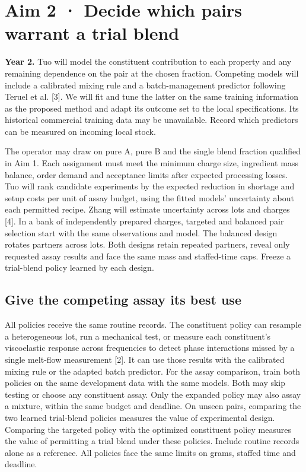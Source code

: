\documentclass[11pt,letterpaper]{article}
\begin{document}
\newpage

\section*{Aim 2 · Decide which pairs warrant a trial blend}

\textbf{Year 2.} Tuo will model the constituent contribution to each property and any remaining dependence on the pair at the chosen fraction. Competing models will include a calibrated mixing rule and a batch-management predictor following Teruel et al. [3]. We will fit and tune the latter on the same training information as the proposed method and adapt its outcome set to the local specifications. Its historical commercial training data may be unavailable. Record which predictors can be measured on incoming local stock.

The operator may draw on pure A, pure B and the single blend fraction qualified in Aim 1. Each assignment must meet the minimum charge size, ingredient mass balance, order demand and acceptance limits after expected processing losses. Tuo will rank candidate experiments by the expected reduction in shortage and setup costs per unit of assay budget, using the fitted models' uncertainty about each permitted recipe. Zhang will estimate uncertainty across lots and charges [4]. In a bank of independently prepared charges, targeted and balanced pair selection start with the same observations and model. The balanced design rotates partners across lots. Both designs retain repeated partners, reveal only requested assay results and face the same mass and staffed-time caps. Freeze a trial-blend policy learned by each design.

\subsection*{Give the competing assay its best use}

All policies receive the same routine records. The constituent policy can resample a heterogeneous lot, run a mechanical test, or measure each constituent's viscoelastic response across frequencies to detect phase interactions missed by a single melt-flow measurement [2]. It can use those results with the calibrated mixing rule or the adapted batch predictor. For the assay comparison, train both policies on the same development data with the same models. Both may skip testing or choose any constituent assay. Only the expanded policy may also assay a mixture, within the same budget and deadline. On unseen pairs, comparing the two learned trial-blend policies measures the value of experimental design. Comparing the targeted policy with the optimized constituent policy measures the value of permitting a trial blend under these policies. Include routine records alone as a reference. All policies face the same limits on grams, staffed time and deadline.
\end{document}
